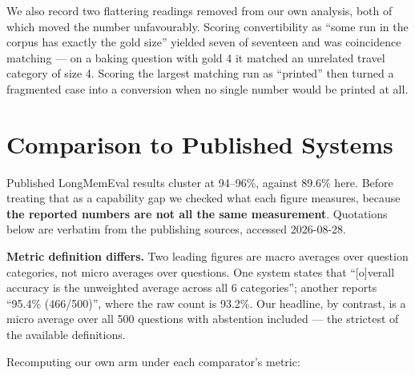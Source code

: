 We also record two flattering readings removed from our own analysis, both of which moved the number unfavourably. Scoring convertibility as ``some run in the corpus has exactly the gold size'' yielded seven of seventeen and was coincidence matching --- on a baking question with gold 4 it matched an unrelated travel category of size 4. Scoring the largest matching run as ``printed'' then turned a fragmented case into a conversion when no single number would be printed at all.

\section{Comparison to Published Systems}
\label{sec:comparison}

Published LongMemEval results cluster at 94--96\%, against 89.6\% here. Before treating that as a capability gap we checked what each figure measures, because \textbf{the reported numbers are not all the same measurement}. Quotations below are verbatim from the publishing sources, accessed 2026-08-28.

\textbf{Metric definition differs.} Two leading figures are macro averages over question categories, not micro averages over questions. One system states that ``[o]verall accuracy is the unweighted average across all 6 categories''; another reports ``95.4\% (466/500)'', where the raw count is 93.2\%. Our headline, by contrast, is a micro average over all 500 questions with abstention included --- the strictest of the available definitions.

Recomputing our own arm under each comparator's metric:

\begin{table}[!htbp]
\centering
\caption{The same result under each metric definition. The headline is unchanged; these are labelled comparability figures.}
\label{tab:metrics}
\end{table}

